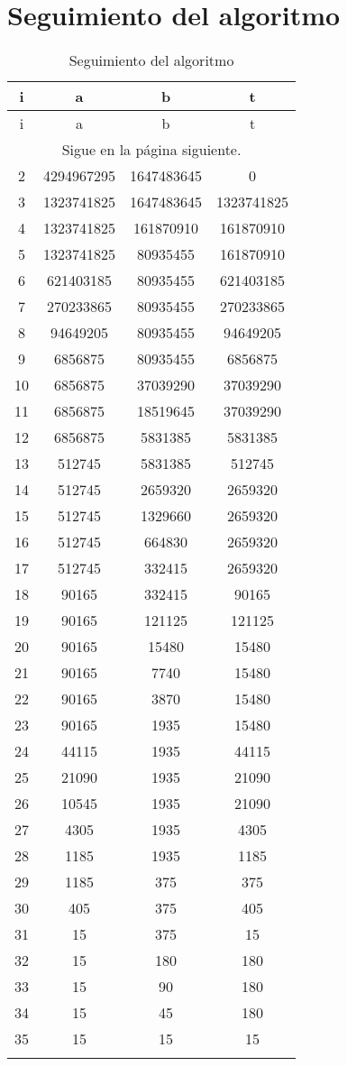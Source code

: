 \section{Seguimiento del algoritmo}
\begin{longtable}{c|c|c|c}
\hline
i & a &  b & t \\
\hline \hline
\endfirsthead
\hline
i & a & b & t \\
\hline \hline
\endhead
\multicolumn{4}{c}{Sigue en la página siguiente.}
\endfoot
\endlastfoot
1&4294967295&3294967290&0\\\hline
2&4294967295&1647483645&0\\\hline
3&1323741825&1647483645&1323741825\\\hline
4&1323741825&161870910&161870910\\\hline
5&1323741825&80935455&161870910\\\hline
6&621403185&80935455&621403185\\\hline
7&270233865&80935455&270233865\\\hline
8&94649205&80935455&94649205\\\hline
9&6856875&80935455&6856875\\\hline
10&6856875&37039290&37039290\\\hline
11&6856875&18519645&37039290\\\hline
12&6856875&5831385&5831385\\\hline
13&512745&5831385&512745\\\hline
14&512745&2659320&2659320\\\hline
15&512745&1329660&2659320\\\hline
16&512745&664830&2659320\\\hline
17&512745&332415&2659320\\\hline
18&90165&332415&90165\\\hline
19&90165&121125&121125\\\hline
20&90165&15480&15480\\\hline
21&90165&7740&15480\\\hline
22&90165&3870&15480\\\hline
23&90165&1935&15480\\\hline
24&44115&1935&44115\\\hline
25&21090&1935&21090\\\hline
26&10545&1935&21090\\\hline
27&4305&1935&4305\\\hline
28&1185&1935&1185\\\hline
29&1185&375&375\\\hline
30&405&375&405\\\hline
31&15&375&15\\\hline
32&15&180&180\\\hline
33&15&90&180\\\hline
34&15&45&180\\\hline
35&15&15&15\\\hline
\caption{Seguimiento del algoritmo}
\label{ta:m}
\end{longtable}